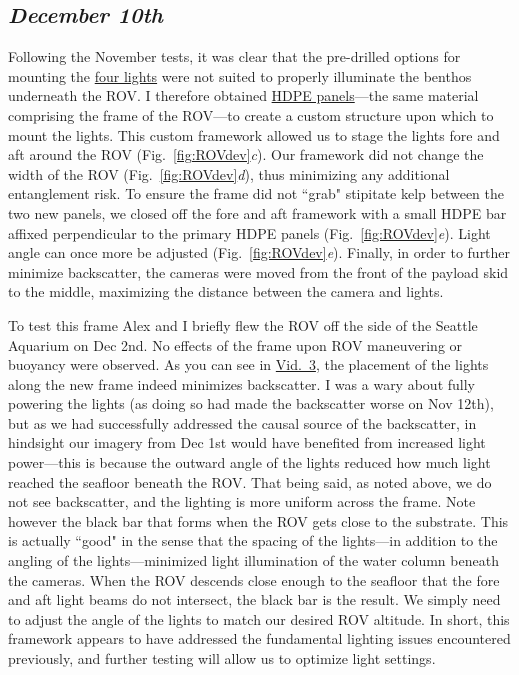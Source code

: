 \documentclass[11pt]{article}
\begin{document}
\subsection{\textit{December 10th}} 
Following the November tests, it was clear that the pre-drilled options 
for mounting the 
\href{https://bluerobotics.com/store/thrusters/lights/lumen-sets-r2-rp/}{four
 lights} were not suited to properly illuminate the benthos 
underneath the ROV. 
I therefore obtained 
\href{https://www.mcmaster.com/hdpe-sheets/marine-grade-moisture-resistant-polyethylene-hdpe-sheets-and-bars/}{HDPE
 panels}---the same material comprising the frame of the ROV---to 
 create a custom structure upon which to mount the lights. 
This custom framework allowed us to stage the lights fore and aft 
around the ROV (Fig.~\ref{fig:ROVdev}\textit{c}).
Our framework did not change the width of the ROV 
(Fig.~\ref{fig:ROVdev}\textit{d}), thus minimizing any additional 
entanglement risk.
To ensure the frame did not ``grab" stipitate kelp between the 
two new panels, we closed off the fore and aft framework with a small 
HDPE bar affixed perpendicular to the primary HDPE panels 
(Fig.~\ref{fig:ROVdev}\textit{e}).
Light angle can once more be adjusted (Fig.~\ref{fig:ROVdev}\textit{e}).
Finally, in order to further minimize backscatter, the cameras were 
moved from the front of the payload skid to the middle, maximizing the 
distance between the camera and lights.
	
To test this frame Alex and I briefly flew the ROV off the side of the 
Seattle Aquarium on Dec 2nd. 
No effects of the frame upon ROV maneuvering or buoyancy were 
observed.  
As you can see in 
\href{https://drive.google.com/file/d/1kINt0jBHkwo7r0JQ8USkrrWeA5Za2jBQ/view?usp=sharing}{Vid.~3},
 the placement of the lights along the new frame indeed minimizes 
backscatter. 
I was a wary about fully powering the lights (as doing so had made 
the backscatter worse on Nov 12th), but as we had successfully 
addressed the causal source of the backscatter, in hindsight our 
imagery from Dec 1st would have benefited from increased light 
power---this is because the outward angle of the lights reduced how 
much light reached the seafloor beneath the ROV. 
That being said, as noted above, we do not see backscatter, 
and the lighting is more uniform across the frame. 
Note however the black bar that forms when the ROV gets close to the 
substrate. 
This is actually ``good" in the sense that the spacing of the 
lights---in addition to the angling of the lights---minimized light 
illumination of the water column beneath the cameras. 
When the ROV descends close enough to the seafloor that the fore and 
aft light beams do not intersect, the black bar is the result. 
We simply need to adjust the angle of the lights to match our desired 
ROV altitude.  
In short, this framework appears to have addressed the fundamental 
lighting issues encountered previously, and further testing will allow 
us to optimize light settings.  
\end{document}
